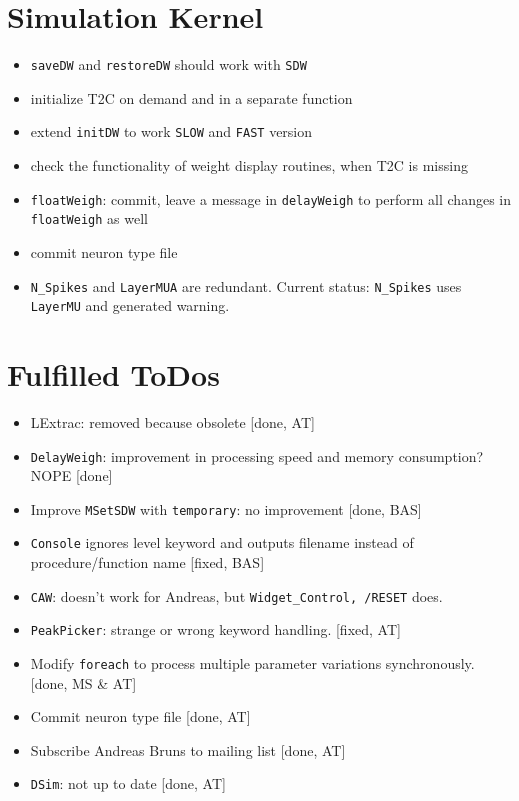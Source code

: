 \documentclass[12pt]{article}
\begin{document}
\section{Simulation Kernel}
\begin{itemize}
\item \texttt{saveDW} and \texttt{restoreDW} should work with \texttt{SDW}
\item initialize T2C on demand and in a separate function
\item extend \texttt{initDW} to work \texttt{SLOW} and \texttt{FAST} version
\item check the functionality of weight display routines, when T2C is missing
\item \texttt{floatWeigh}: commit, leave a message in \texttt{delayWeigh} to perform all changes in \texttt{floatWeigh} as well
\item commit neuron type file
\item \texttt{N_Spikes} and \texttt{LayerMUA} are redundant. Current status: \texttt{N_Spikes} uses \texttt{LayerMU} and generated warning.
\end{itemize}



\section{Fulfilled ToDos}
\begin{itemize}
\item LExtrac: removed because obsolete [done, AT]
\item \texttt{DelayWeigh}: improvement in processing speed and memory consumption? NOPE [done]
\item Improve \texttt{MSetSDW} with \texttt{temporary}: no improvement [done, BAS]
\item \texttt{Console} ignores level keyword and outputs filename instead of procedure/function name [fixed, BAS]
\item \texttt{CAW}: doesn't work for Andreas, but \texttt{Widget_Control, /RESET} does.
\item \texttt{PeakPicker}: strange or wrong keyword handling. [fixed, AT]
\item Modify \texttt{foreach} to process multiple parameter variations synchronously. [done, MS & AT] 
\item Commit neuron type file [done, AT]
\item Subscribe Andreas Bruns to mailing list [done, AT] 
\item \texttt{DSim}: not up to date [done, AT]
\end{itemize}
\end{document}

